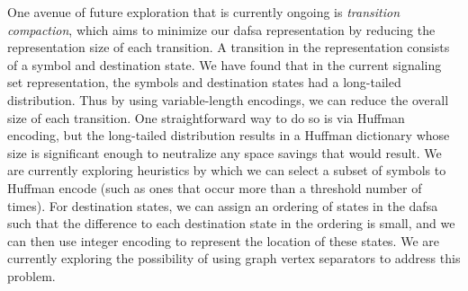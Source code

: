 One avenue of future exploration that is currently ongoing is \emph{transition
compaction}, which aims to minimize our \ac{dafsa} representation by reducing
the representation size of each transition. A transition in the representation
consists of a symbol and destination state. We have found that in the current
signaling set representation, the symbols and destination states had a
long-tailed distribution. Thus by using variable-length encodings, we can reduce
the overall size of each transition. One straightforward way to do so is via
Huffman encoding, but the long-tailed distribution results in a Huffman
dictionary whose size is significant enough to neutralize any space savings that
would result. We are currently exploring heuristics by which we can select a
subset of symbols to Huffman encode (such as ones that occur more than a
threshold number of times). For destination states, we can assign an ordering of
states in the \ac{dafsa} such that the difference to each destination state in
the ordering is small, and we can then use integer encoding to represent the
location of these states. We are currently exploring the possibility of using
graph vertex separators to address this problem.

